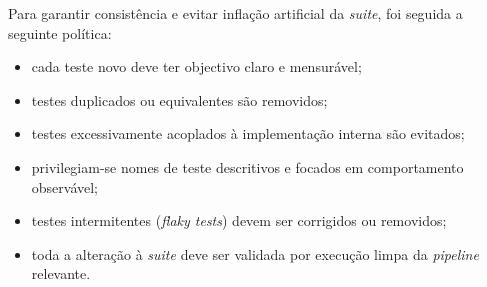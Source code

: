 \documentclass{article}
\begin{document}
Para garantir consistência e evitar inflação artificial da \emph{suite}, foi seguida a seguinte política:
\begin{itemize}
    \item cada teste novo deve ter objectivo claro e mensurável;
    \item testes duplicados ou equivalentes são removidos;
    \item testes excessivamente acoplados à implementação interna são evitados;
    \item privilegiam-se nomes de teste descritivos e focados em comportamento observável;
    \item testes intermitentes (\emph{flaky tests}) devem ser corrigidos ou removidos;
    \item toda a alteração à \emph{suite} deve ser validada por execução limpa da \emph{pipeline} relevante.
\end{itemize}
\end{document}
